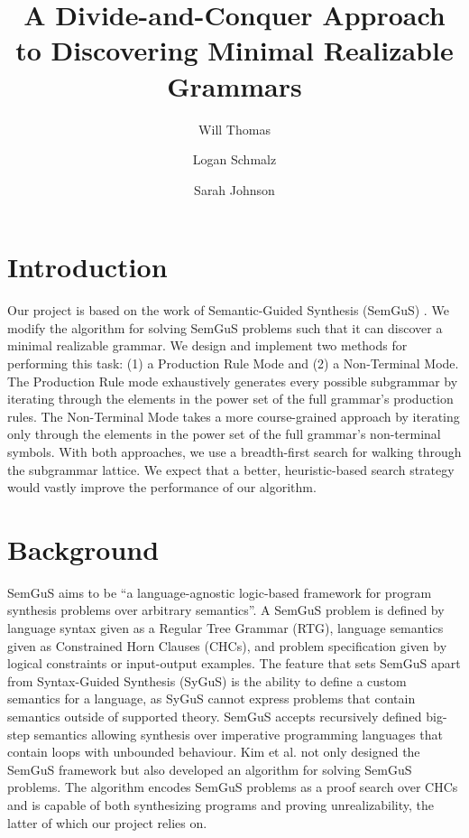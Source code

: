 \documentclass[acmsmall, nonacm]{acmart}
\begin{document}
\title{A Divide-and-Conquer Approach to Discovering Minimal Realizable Grammars}


\author{Will Thomas}
\author{Logan Schmalz}
\author{Sarah Johnson}


\maketitle

\section{Introduction}
Our project is based on the work of Semantic-Guided Synthesis (SemGuS) \cite{semgus}. We modify the algorithm for solving SemGuS problems such that it can discover a minimal realizable grammar. We design and implement two methods for performing this task: (1) a Production Rule Mode and (2) a Non-Terminal Mode. The Production Rule mode exhaustively generates every possible subgrammar by iterating through the elements in the power set of the full grammar's production rules. The Non-Terminal Mode takes a more course-grained approach by iterating only through the elements in the power set of the full grammar's non-terminal symbols. With both approaches, we use a breadth-first search for walking through the subgrammar lattice. We expect that a better, heuristic-based search strategy would vastly improve the performance of our algorithm.


\section{Background}
SemGuS aims to be ``a language-agnostic logic-based framework for program synthesis problems over arbitrary semantics''. A SemGuS problem is defined by language syntax given as a Regular Tree Grammar (RTG), language semantics given as Constrained Horn Clauses (CHCs), and problem specification given by logical constraints or input-output examples. The feature that sets SemGuS apart from Syntax-Guided Synthesis (SyGuS) is the ability to define a custom semantics for a language, as SyGuS cannot express problems that contain semantics outside of supported theory. SemGuS accepts recursively defined
big-step semantics allowing synthesis over imperative programming languages that contain loops with unbounded behaviour. Kim et al. not only designed the SemGuS framework but also developed an algorithm for solving SemGuS problems. The algorithm encodes SemGuS problems as a proof search over CHCs and is capable of both synthesizing programs and proving unrealizability, the latter of which our project relies on.
\end{document}
